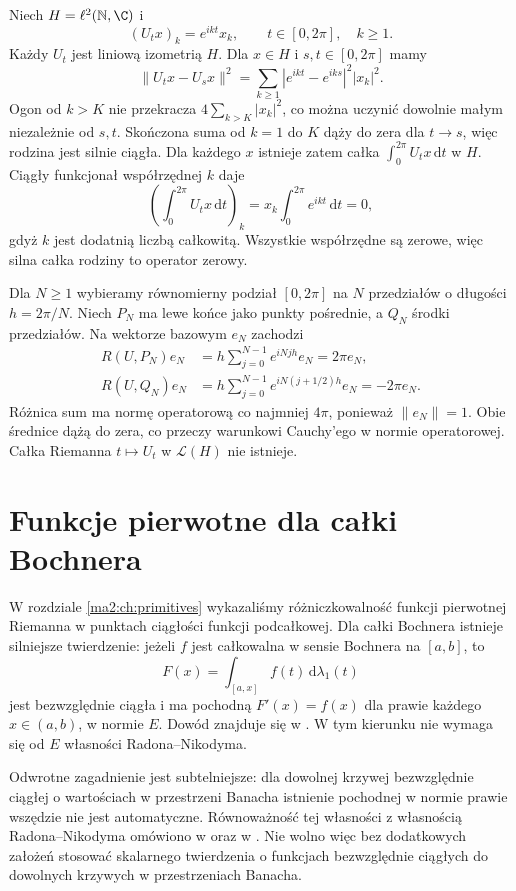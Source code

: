 \begin{przyklad}
\label{ma2:ex:vector-operator-strong-not-norm}
Niech $H=\ell^2(\mathbb N,\C)$ i
\[
 (U_t x)_k=e^{ikt}x_k,\qquad
 t\in[0,2\pi],\quad k\ge1.
\]
Każdy $U_t$ jest liniową izometrią $H$.
Dla $x\in H$ i $s,t\in[0,2\pi]$ mamy
\[
 \|U_t x-U_s x\|^2
 =\sum_{k\ge1}|e^{ikt}-e^{iks}|^2|x_k|^2.
\]
Ogon od $k>K$ nie przekracza
$4\sum_{k>K}|x_k|^2$, co można uczynić
dowolnie małym niezależnie od $s,t$.
Skończona suma od $k=1$ do $K$ dąży do zera
dla $t\to s$, więc rodzina jest silnie ciągła.
Dla każdego $x$ istnieje zatem całka
$\int_0^{2\pi}U_t x\,\mathrm dt$ w $H$.
Ciągły funkcjonał współrzędnej $k$ daje
\[
 \left(\int_0^{2\pi}U_t x\,\mathrm dt\right)_k
 =x_k\int_0^{2\pi}e^{ikt}\,\mathrm dt=0,
\]
gdyż $k$ jest dodatnią liczbą całkowitą.
Wszystkie współrzędne są zerowe, więc
silna całka rodziny to operator zerowy.

Dla $N\ge1$ wybieramy równomierny podział
$[0,2\pi]$ na $N$ przedziałów o długości
$h=2\pi/N$. Niech $P_N$ ma lewe końce jako
punkty pośrednie, a $Q_N$ środki przedziałów.
Na wektorze bazowym $e_N$ zachodzi
\[
 \begin{aligned}
 R(U,P_N)e_N
 &=h\sum_{j=0}^{N-1}e^{iN jh}e_N=2\pi e_N,\\
 R(U,Q_N)e_N
 &=h\sum_{j=0}^{N-1}e^{iN(j+1/2)h}e_N=-2\pi e_N.
 \end{aligned}
\]
Różnica sum ma normę operatorową co najmniej
$4\pi$, ponieważ $\|e_N\|=1$.
Obie średnice dążą do zera, co przeczy
warunkowi Cauchy'ego w normie operatorowej.
Całka Riemanna $t\mapsto U_t$ w
$\mathcal L(H)$ nie istnieje.
\end{przyklad}

\section{Funkcje pierwotne dla całki Bochnera}

W rozdziale \ref{ma2:ch:primitives} wykazaliśmy
różniczkowalność funkcji pierwotnej Riemanna
w punktach ciągłości funkcji podcałkowej.
Dla całki Bochnera istnieje silniejsze
twierdzenie: jeżeli $f$ jest całkowalna w sensie
Bochnera na $[a,b]$, to
\[
 F(x)=\int_{[a,x]} f(t)\,\mathrm d\lambda_1(t)
\]
jest bezwzględnie ciągła i ma pochodną
$F'(x)=f(x)$ dla prawie każdego $x\in(a,b)$,
w normie $E$. Dowód znajduje się w
.
W tym kierunku nie wymaga się od $E$
własności Radona--Nikodyma.

Odwrotne zagadnienie jest subtelniejsze:
dla dowolnej krzywej bezwzględnie ciągłej
o wartościach w przestrzeni Banacha istnienie
pochodnej w normie prawie wszędzie nie jest
automatyczne. Równoważność tej własności
z własnością Radona--Nikodyma omówiono w
oraz w .
Nie wolno więc bez dodatkowych założeń
stosować skalarnego twierdzenia o funkcjach
bezwzględnie ciągłych do dowolnych krzywych
w przestrzeniach Banacha.

